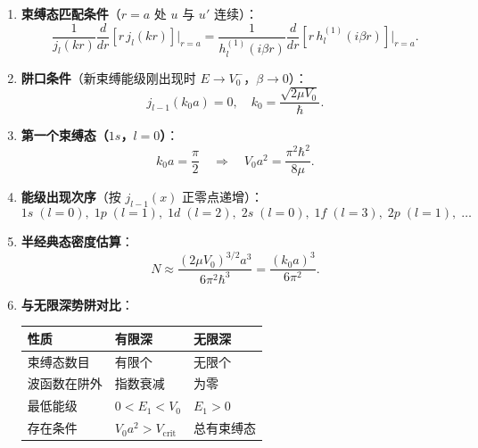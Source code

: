 \begin{formulabox}[核心公式]
\begin{enumerate}[label=\textbf{(\arabic*)}]
    \item \textbf{束缚态匹配条件}（$r=a$ 处 $u$ 与 $u'$ 连续）：
    \[
    \frac{1}{j_l(kr)}\frac{d}{dr}[r\,j_l(kr)]\bigg|_{r=a}=\frac{1}{h_l^{(1)}(i\beta r)}\frac{d}{dr}[r\,h_l^{(1)}(i\beta r)]\bigg|_{r=a}.
    \]

    \item \textbf{阱口条件}（新束缚能级刚出现时 $E\to V_0^-$，$\beta\to0$）：
    \[
    j_{l-1}(k_0a)=0,\quad k_0=\frac{\sqrt{2\mu V_0}}{\hbar}.
    \]

    \item \textbf{第一个束缚态（$1s$，$l=0$）}：
    \[
    k_0a=\frac{\pi}{2}\quad\Rightarrow\quad V_0a^2=\frac{\pi^2\hbar^2}{8\mu}.
    \]

    \item \textbf{能级出现次序}（按 $j_{l-1}(x)$ 正零点递增）：
    \[
    1s\;(l=0),\;1p\;(l=1),\;1d\;(l=2),\;2s\;(l=0),\;1f\;(l=3),\;2p\;(l=1),\;\ldots
    \]

    \item \textbf{半经典态密度估算}：
    \[
    N\approx\frac{(2\mu V_0)^{3/2}a^3}{6\pi^2\hbar^3}=\frac{(k_0a)^3}{6\pi^2}.
    \]

    \item \textbf{与无限深势阱对比}：
    \begin{center}
    \begin{tabular}{lll}
    \toprule
    \textbf{性质} & \textbf{有限深} & \textbf{无限深} \\
    \midrule
    束缚态数目 & 有限个 & 无限个 \\
    波函数在阱外 & 指数衰减 & 为零 \\
    最低能级 & $0<E_1<V_0$ & $E_1>0$ \\
    存在条件 & $V_0a^2>V_{\text{crit}}$ & 总有束缚态 \\
    \bottomrule
    \end{tabular}
    \end{center}
\end{enumerate}
\end{formulabox}

